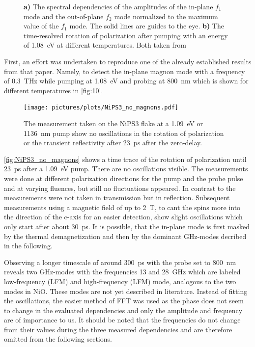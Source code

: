 \begin{figure}[ht]
\begin{subfigure}[b]{0.28\textwidth}
        \caption{}
        \label{fig:10}
    \end{subfigure}
    \caption{\textbf{a)} The spectral dependencies of the amplitudes of the in-plane $f_1$ mode and the out-of-plane $f_2$ mode normalized to the maximum value of the $f_1$ mode. The solid lines are guides to the eye. \textbf{b)} The time-resolved rotation of polarization after pumping with an energy of \qty{1.08}{eV} at different temperatures. Both taken from \cite{afanasiev_controlling_2021}}
\end{figure}
\FloatBarrier
First, an effort was undertaken to reproduce one of the already established results from that paper.
Namely, to detect the in-plane magnon mode with a frequency of \qty{0.3}{THz} while pumping at \qty{1.08}{eV} and probing at \qty{800}{nm} which is shown for different temperatures in \autoref{fig:10}.
\begin{figure}[ht]
    \centering
    \texttt{[image: pictures/plots/NiPS3\_no\_magnons.pdf]} \vspace{-0.3cm}
    \caption{The measurement taken on the NiPS3 flake at a \qty{1.09}{eV} or \qty{1136}{nm} pump show no oscillations in the rotation of polarization or the transient reflectivity after \qty{23}{ps} after the zero-delay.}
    \label{fig:NiPS3_no_magnons}
\end{figure}
\FloatBarrier
\autoref{fig:NiPS3_no_magnons} shows a time trace of the rotation of polarization until \qty{23}{ps} after a \qty{1.09}{eV} pump.
There are no oscillations visible.
The measurements were done at different polarization directions for the pump and the probe pulse and at varying fluences, but still no fluctuations appeared.
In contrast to \cite{afanasiev_controlling_2021}\cite{toyoda_phase_2023} the measurements were not taken in transmission but in reflection.
Subsequent measurements using a magnetic field of up to \qty{2}{T}, to cant the spins more into the direction of the c-axis for an easier detection, show slight oscillations which only start after about \qty{30}{ps}.
It is possible, that the in-plane mode is first masked by the thermal demagnetization and then by the dominant GHz-modes decribed in the following.

Observing a longer timescale of around \qty{300}{ps} with the probe set to \qty{800}{nm} reveals two GHz-modes with the frequencies 13 and \qty{28}{GHz} which are labeled low-frequency (LFM) and high-frequency (LFM) mode, analogous to the two modes in NiO.
These modes are not yet described in literature.
Instead of fitting the oscillations, the easier method of FFT was used as the phase does not seem to change in the evaluated dependencies and only the amplitude and frequency are of importance to us.
It should be noted that the frequencies do not change from their values during the three measured dependencies and are therefore omitted from the following sections.

